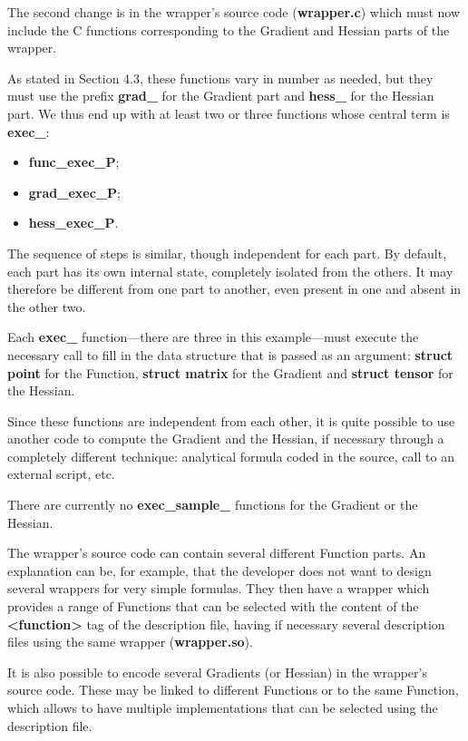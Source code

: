 The second change is in the wrapper's source code ({\bf wrapper.c}) which must now include the C functions corresponding to the Gradient and Hessian parts of the wrapper.

As stated in Section 4.3, these functions vary in number as needed, but they must use the prefix {\bf grad\_} for the Gradient part and {\bf hess\_} for the Hessian part. We thus end up with at least two or three functions whose central term is {\bf exec\_}:
\begin{itemize}
\item {\bf func\_exec\_P};
\item {\bf grad\_exec\_P};
\item {\bf hess\_exec\_P}.
\end{itemize}

The sequence of steps is similar, though independent for each part. By default, each part has its own internal state, completely isolated from the others. It may therefore be different from one part to another, even present in one and absent in the other two.

Each {\bf exec\_} function---there are three in this example---must execute the necessary call to fill in the data structure that is passed as an argument: {\bf struct point} for the Function, {\bf struct matrix} for the Gradient and {\bf struct tensor} for the Hessian.

Since these functions are independent from each other, it is quite possible to use another code to compute the Gradient and the Hessian, if necessary through a completely different technique: analytical formula coded in the source, call to an external script, etc.

There are currently no {\bf exec\_sample\_} functions for the Gradient or the Hessian.

The wrapper's source code can contain several different Function parts. An explanation can be, for example, that the developer does not want to design several wrappers for very simple formulas. They then have a wrapper which provides a range of Functions that can be selected with the content of the {\bf <function>} tag of the description file, having if necessary several description files using the same wrapper ({\bf wrapper.so}).

It is also possible to encode several Gradients (or Hessian) in the wrapper's source code. These may be linked to different Functions or to the same Function, which allows to have multiple implementations that can be selected using the description file.

